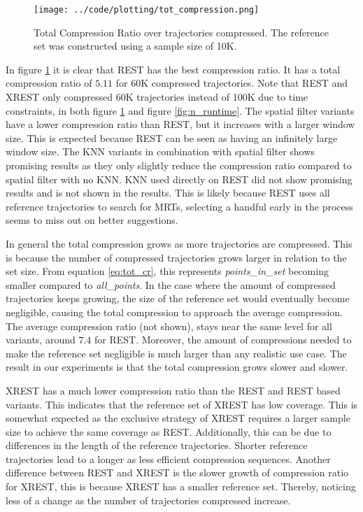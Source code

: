 \begin{figure}[h]
    \begin{minipage}{0.99\linewidth}
        \centering
        \texttt{[image: ../code/plotting/tot\_compression.png]}
        \caption{Total Compression Ratio over trajectories compressed. The reference set was constructed using a sample size of 10K.}
        \label{fig:n_compression}
    \end{minipage}
\end{figure}

In figure \ref{fig:n_compression} it is clear that REST has the best compression ratio. It has a total compression ratio of $5.11$ for 60K compressed trajectories. Note that REST and XREST only compressed 60K trajectories instead of 100K due to time constraints, in both figure \ref{fig:n_compression} and figure \ref{fig:n_runtime}. The spatial filter variants have a lower compression ratio than REST, but it increases with a larger window size. This is expected because REST can be seen as having an infinitely large window size. The KNN variants in combination with spatial filter shows promising results as they only slightly reduce the compression ratio compared to spatial filter with no KNN. KNN used directly on REST did not show promising results and is not shown in the results. This is likely because REST uses all reference trajectories to search for MRTs, selecting a handful early in the process seems to miss out on better suggestions.

In general the total compression grows as more trajectories are compressed. This is because the number of compressed trajectories grows larger in relation to the set size. From equation \ref{eq:tot_cr}, this represents \textit{points\_in\_set} becoming smaller compared to \textit{all\_points}. In the case where the amount of compressed trajectories keeps growing, the size of the reference set would eventually become negligible, causing the total compression to approach the average compression. The average compression ratio (not shown), stays near the same level for all variants, around $7.4$ for REST. Moreover, the amount of compressions needed to make the reference set negligible is much larger than any realistic use case. The result in our experiments is that the total compression grows slower and slower.

XREST has a much lower compression ratio than the REST and REST based variants. This indicates that the reference set of XREST has low coverage. This is somewhat expected as the exclusive strategy of XREST requires a larger sample size to achieve the same coverage as REST. Additionally, this can be due to differences in the length of the reference trajectories. Shorter reference trajectories lead to a longer as less efficient compression sequences. Another difference between REST and XREST is the slower growth of compression ratio for XREST, this is because XREST has a smaller reference set. Thereby, noticing less of a change as the number of trajectories compressed increase.

